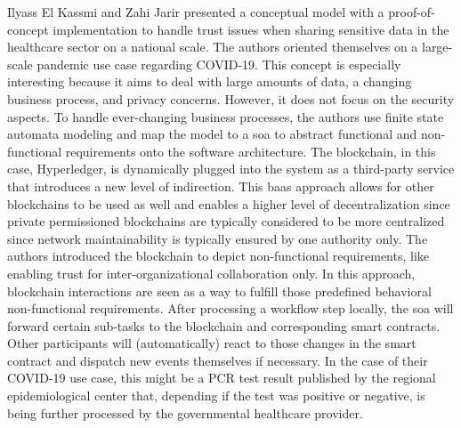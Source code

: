 Ilyass El Kassmi and Zahi Jarir presented a conceptual model with a proof-of-concept implementation to handle trust issues when sharing sensitive data in the healthcare sector on a national scale. The authors oriented themselves on a large-scale pandemic use case regarding COVID-19. This concept is especially interesting because it aims to deal with large amounts of data, a changing business process, and privacy concerns. However, it does not focus on the security aspects. To handle ever-changing business processes, the authors use finite state automata modeling and map the model to a \gls{soa} to abstract functional and non-functional requirements onto the software architecture. The blockchain, in this case, Hyperledger, is dynamically plugged into the system as a third-party service that introduces a new level of indirection. This \gls{baas} approach allows for other blockchains to be used as well and enables a higher level of decentralization since private permissioned blockchains are typically considered to be more centralized since network maintainability is typically ensured by one authority only. The authors introduced the blockchain to depict non-functional requirements, like enabling trust for inter-organizational collaboration only. In this approach, blockchain interactions are seen as a way to fulfill those predefined behavioral non-functional requirements. After processing a workflow step locally, the \gls{soa} will forward certain sub-tasks to the blockchain and corresponding smart contracts. Other participants will (automatically) react to those changes in the smart contract and dispatch new events themselves if necessary. In the case of their COVID-19 use case, this might be a PCR test result published by the regional epidemiological center that, depending if the test was positive or negative, is being further processed by the governmental healthcare provider.

